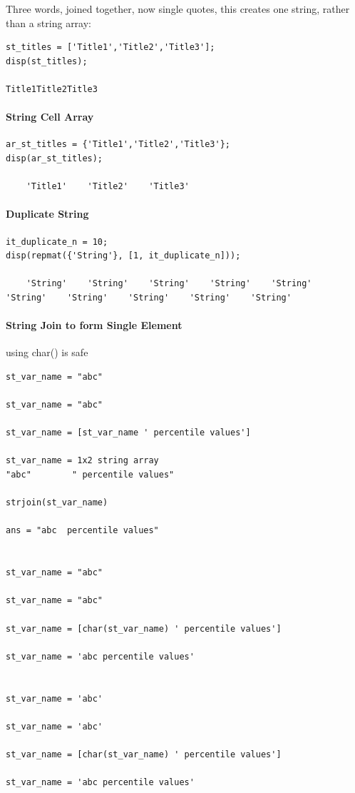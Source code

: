 \documentclass[
]{book}
\begin{document}
Three words, joined together, now single quotes, this creates one
string, rather than a string array:

\begin{verbatim}
st_titles = ['Title1','Title2','Title3'];
disp(st_titles);

Title1Title2Title3
\end{verbatim}

\hypertarget{string-cell-array}{%
\paragraph{String Cell Array}\label{string-cell-array}}

\begin{verbatim}
ar_st_titles = {'Title1','Title2','Title3'};
disp(ar_st_titles);

    'Title1'    'Title2'    'Title3'
\end{verbatim}

\hypertarget{duplicate-string}{%
\paragraph{Duplicate String}\label{duplicate-string}}

\begin{verbatim}
it_duplicate_n = 10;
disp(repmat({'String'}, [1, it_duplicate_n]));

    'String'    'String'    'String'    'String'    'String'    'String'    'String'    'String'    'String'    'String'
\end{verbatim}

\hypertarget{string-join-to-form-single-element}{%
\paragraph{String Join to form Single Element}\label{string-join-to-form-single-element}}

using char() is safe

\begin{verbatim}
st_var_name = "abc"

st_var_name = "abc"

st_var_name = [st_var_name ' percentile values']

st_var_name = 1x2 string array    
"abc"        " percentile values"    

strjoin(st_var_name)

ans = "abc  percentile values"


st_var_name = "abc"

st_var_name = "abc"

st_var_name = [char(st_var_name) ' percentile values']

st_var_name = 'abc percentile values'


st_var_name = 'abc'

st_var_name = 'abc'

st_var_name = [char(st_var_name) ' percentile values']

st_var_name = 'abc percentile values'
\end{verbatim}
\end{document}
